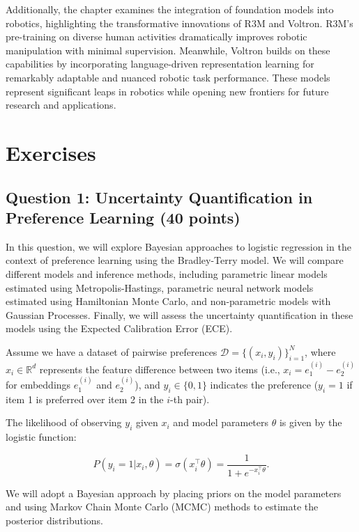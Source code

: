 \documentclass[
  letterpaper,
  numbers=noenddot,
  DIV=11]{scrreprt}
\theoremstyle{plain}
\theoremstyle{definition}
\theoremstyle{plain}
\theoremstyle{remark}
\begin{document}
Additionally, the chapter examines the integration of foundation models
into robotics, highlighting the transformative innovations of R3M and
Voltron. R3M's pre-training on diverse human activities dramatically
improves robotic manipulation with minimal supervision. Meanwhile,
Voltron builds on these capabilities by incorporating language-driven
representation learning for remarkably adaptable and nuanced robotic
task performance. These models represent significant leaps in robotics
while opening new frontiers for future research and applications.

\section{Exercises}\label{exercises-1}

\subsection*{Question 1: Uncertainty Quantification in Preference
Learning (40
points)}\label{sec-question-1-uncertainty-quantification-in-preference-learning-40-points}

In this question, we will explore Bayesian approaches to logistic
regression in the context of preference learning using the Bradley-Terry
model. We will compare different models and inference methods, including
parametric linear models estimated using Metropolis-Hastings, parametric
neural network models estimated using Hamiltonian Monte Carlo, and
non-parametric models with Gaussian Processes. Finally, we will assess
the uncertainty quantification in these models using the Expected
Calibration Error (ECE).

Assume we have a dataset of pairwise preferences
\(\mathcal{D} = \{(x_i, y_i)\}_{i=1}^N\), where \(x_i \in \mathbb{R}^d\)
represents the feature difference between two items (i.e.,
\(x_i = e^{(i)}_1 - e^{(i)}_2\) for embeddings \(e^{(i)}_1\) and
\(e^{(i)}_2\)), and \(y_i \in \{0, 1\}\) indicates the preference
(\(y_i = 1\) if item 1 is preferred over item 2 in the \(i\)-th pair).

The likelihood of observing \(y_i\) given \(x_i\) and model parameters
\(\theta\) is given by the logistic function:

\[P(y_i = 1 | x_i, \theta) = \sigma(x_i^\top \theta) = \frac{1}{1 + e^{-x_i^\top \theta}}.\]

We will adopt a Bayesian approach by placing priors on the model
parameters and using Markov Chain Monte Carlo (MCMC) methods to estimate
the posterior distributions.
\end{document}

